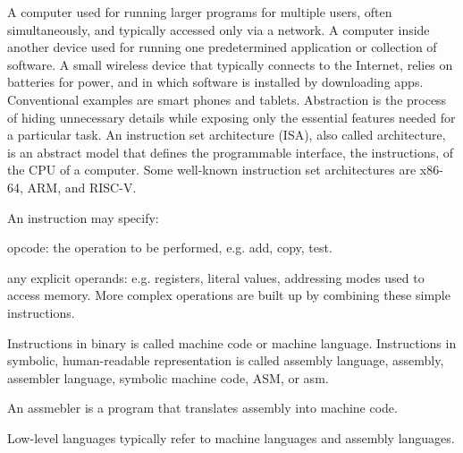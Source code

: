 \documentclass[a4paper,12pt]{report}
\begin{document}
A computer used for running larger programs for multiple users, often simultaneously, and typically accessed only via a network.
A computer inside another device used for running one predetermined application or collection of software.
A small wireless device that typically connects to the Internet, relies on batteries for power, and in which software is installed by downloading apps. Conventional examples are smart phones and tablets.
Abstraction is the process of hiding unnecessary details while exposing only the essential features needed for a particular task.
An instruction set architecture (ISA), also called architecture, is an abstract model that defines the programmable interface, the instructions, of the CPU of a computer. Some well-known instruction set architectures are x86-64, ARM, and RISC-V.

An instruction may specify:
\bit
\item opcode: the operation to be performed, e.g. add, copy, test.
\item any explicit operands: e.g. registers, literal values, addressing modes used to access memory.
\eit
More complex operations are built up by combining these simple instructions.

Instructions in binary is called machine code or machine language. Instructions in symbolic, human-readable representation is called assembly language, assembly, assembler language, symbolic machine code, ASM, or asm.

An assmebler is a program that translates assembly into machine code.

Low-level languages typically refer to machine languages and assembly languages.
\end{document}
